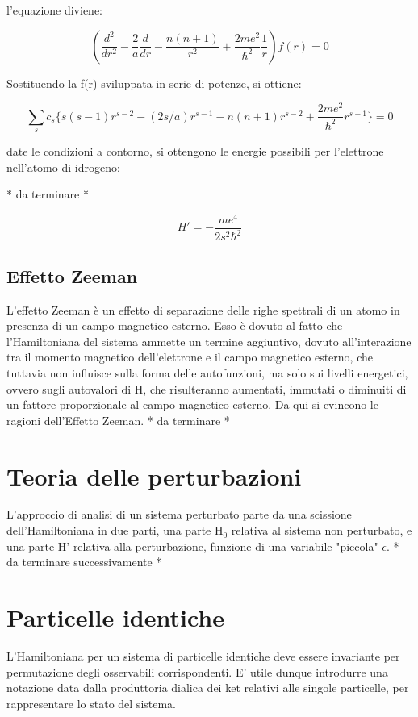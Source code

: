\documentclass{article}
\begin{document}
l'equazione diviene:

\begin{equation}
    \left(\frac{d^2}{dr^2} -\frac{2}{a}\frac{d}{dr} -\frac{n(n+1)}{r^2} +\frac{2me^2}{\hbar^2}\frac{1}{r}\right)f(r)=0
\end{equation}

Sostituendo la f(r) sviluppata in serie di potenze, si ottiene:

\begin{equation}
    \sum_{s} c_s \{s(s-1)r^{s-2}-(2s/a)r^{s-1}-n(n+1)r^{s-2}+\frac{2me^2}{\hbar^2}r^{s-1} \}=0
\end{equation}

date le condizioni a contorno, si ottengono le energie possibili per l'elettrone nell'atomo di idrogeno:

* da terminare *

\begin{equation}
    H'=-\frac{me^4}{2s^2\hbar^2}
\end{equation}

\subsection{Effetto Zeeman}
L'effetto Zeeman è un effetto di separazione delle righe spettrali di un atomo in presenza di un campo magnetico esterno.
Esso è dovuto al fatto che l'Hamiltoniana del sistema ammette un termine aggiuntivo, dovuto all'interazione tra il momento magnetico dell'elettrone e il campo magnetico esterno,
che tuttavia non influisce sulla forma delle autofunzioni, ma solo sui livelli energetici, ovvero sugli autovalori di H,
che risulteranno aumentati, immutati o diminuiti di un fattore proporzionale al campo magnetico esterno.
Da qui si evincono le ragioni dell'Effetto Zeeman.
* da terminare *


\section{Teoria delle perturbazioni}
L'approccio di analisi di un sistema perturbato parte da una scissione dell'Hamiltoniana in due parti, una parte H$_0$ relativa al sistema non perturbato, e una parte H' relativa alla perturbazione, funzione di una variabile "piccola" $\epsilon$.
* da terminare successivamente *

\section{Particelle identiche}
L'Hamiltoniana per un sistema di particelle identiche deve essere invariante per permutazione degli osservabili corrispondenti.
E' utile dunque introdurre una notazione data dalla produttoria dialica dei ket relativi alle singole particelle, per rappresentare lo stato del sistema.
\end{document}
